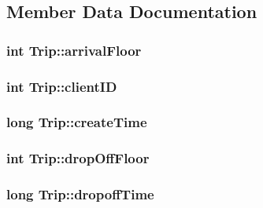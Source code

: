 \subsection{Member Data Documentation}
\hypertarget{struct_trip_a198b5036c3d1a9ea374353a64380a38d}{}
\subsubsection[{arrival\+Floor}]{\setlength{\rightskip}{0pt plus 5cm}int Trip\+::arrival\+Floor}\label{struct_trip_a198b5036c3d1a9ea374353a64380a38d}
\hypertarget{struct_trip_a439a16d8f60a6f0082fe013471e95f8e}{}
\subsubsection[{client\+I\+D}]{\setlength{\rightskip}{0pt plus 5cm}int Trip\+::client\+I\+D}\label{struct_trip_a439a16d8f60a6f0082fe013471e95f8e}
\hypertarget{struct_trip_ab24fb09ff870245973d166fb41130342}{}
\subsubsection[{create\+Time}]{\setlength{\rightskip}{0pt plus 5cm}long Trip\+::create\+Time}\label{struct_trip_ab24fb09ff870245973d166fb41130342}
\hypertarget{struct_trip_aa698c9522767f86364bffda768c48b7e}{}
\subsubsection[{drop\+Off\+Floor}]{\setlength{\rightskip}{0pt plus 5cm}int Trip\+::drop\+Off\+Floor}\label{struct_trip_aa698c9522767f86364bffda768c48b7e}
\hypertarget{struct_trip_a32dff92efdcabc7294328d8e23b238af}{}
\subsubsection[{dropoff\+Time}]{\setlength{\rightskip}{0pt plus 5cm}long Trip\+::dropoff\+Time}\label{struct_trip_a32dff92efdcabc7294328d8e23b238af}
\hypertarget{struct_trip_a734134f36b0e7d28e79ed51209033505}{}
